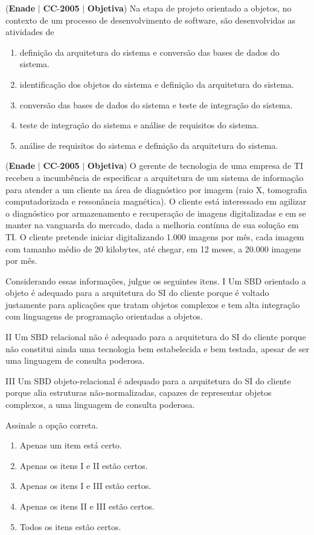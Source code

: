 \documentclass{exam}
\begin{document}
\begin{questions}
\question (\textbf{Enade} $|$ \textbf{CC}-\textbf{2005} $|$ \textbf{Objetiva})
Na etapa de projeto orientado a objetos, no contexto de um
processo de desenvolvimento de software, são desenvolvidas as
atividades de
	\begin{enumerate}[label=\alph*)]
		\item  definição da arquitetura do sistema e conversão das bases de
dados do sistema.
		\item  identificação dos objetos do sistema e definição da
arquitetura do sistema.
		\item  conversão das bases de dados do sistema e teste de
integração do sistema.
		\item  teste de integração do sistema e análise de requisitos do
sistema.
		\item  análise de requisitos do sistema e definição da arquitetura
do sistema.
	\end{enumerate}

\question (\textbf{Enade} $|$ \textbf{CC}-\textbf{2005} $|$ \textbf{Objetiva})
O gerente de tecnologia de uma empresa de TI
recebeu a incumbência de especificar a arquitetura de um
sistema de informação para atender a um cliente na área de
diagnóstico por imagem (raio X, tomografia computadorizada
e ressonância magnética). O cliente está interessado em
agilizar o diagnóstico por armazenamento e recuperação de
imagens digitalizadas e em se manter na vanguarda do
mercado, dada a melhoria contínua de sua solução em TI.
O cliente pretende iniciar digitalizando 1.000 imagens por
mês, cada imagem com tamanho médio de 20 kilobytes, até
chegar, em 12 meses, a 20.000 imagens por mês.

Considerando essas informações, julgue os seguintes itens.
I Um SBD orientado a objeto é adequado para a arquitetura do SI
do cliente porque é voltado justamente para aplicações que
tratam objetos complexos e tem alta integração com linguagens
de programação orientadas a objetos.

II Um SBD relacional não é adequado para a arquitetura do SI do
cliente porque não constitui ainda uma tecnologia bem
estabelecida e bem testada, apesar de ser uma linguagem de
consulta poderosa.

III Um SBD objeto-relacional é adequado para a arquitetura do SI
do cliente porque alia estruturas não-normalizadas, capazes de
representar objetos complexos, a uma linguagem de consulta
poderosa.

Assinale a opção correta.
	\begin{enumerate}[label=\alph*)]
		\item  Apenas um item está certo.
		\item  Apenas os itens I e II estão certos.
		\item  Apenas os itens I e III estão certos.
		\item  Apenas os itens II e III estão certos.
		\item  Todos os itens estão certos.
	\end{enumerate}


\end{questions}
\end{document}
